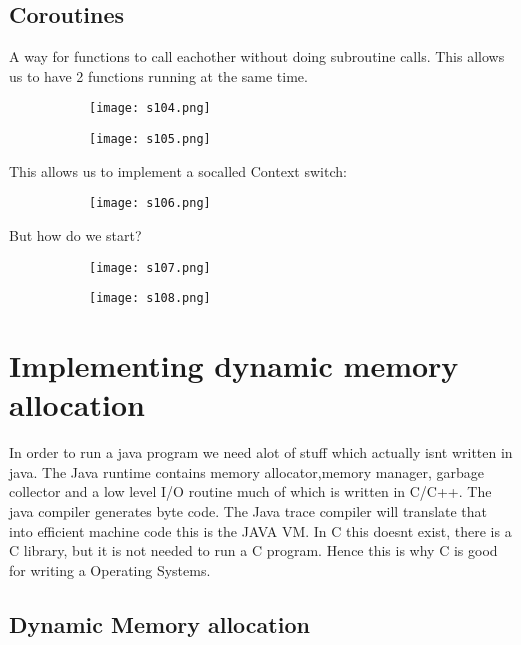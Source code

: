 \documentclass[8pt]{extreport}
\begin{document}
\section{Coroutines}
A way for functions to call eachother without doing subroutine calls. This allows us to have 2 functions running at the same time.
\begin{figure}[H]
\centering
\begin{subfigure}[b]{0.4\linewidth}
\texttt{[image: s104.png]}
\end{subfigure}
\begin{subfigure}[b]{0.4\linewidth}
\texttt{[image: s105.png]}
\end{subfigure}
\end{figure}
This allows us to implement a socalled Context switch:
\begin{figure}[H]
\centering
\begin{subfigure}[b]{0.4\linewidth}
\texttt{[image: s106.png]}
\end{subfigure}
\end{figure}
But how do we start?
\begin{figure}[H]
\centering
\begin{subfigure}[b]{0.4\linewidth}
\texttt{[image: s107.png]}
\end{subfigure}
\begin{subfigure}[b]{0.4\linewidth}
\texttt{[image: s108.png]}
\end{subfigure}
\end{figure}

\chapter{Implementing dynamic memory allocation}

In order to run a java program we need alot of stuff which actually isnt written in java. The Java runtime contains memory allocator,memory manager, garbage collector and a low level I/O routine much of which is written in C/C++. The java compiler generates byte code. The Java trace compiler will translate that into efficient machine code this is the JAVA VM. In C this doesnt exist, there is a C library, but it is not needed to run a C program. Hence this is why C is good for writing a Operating Systems. 

\section{Dynamic Memory allocation}
\end{document}
